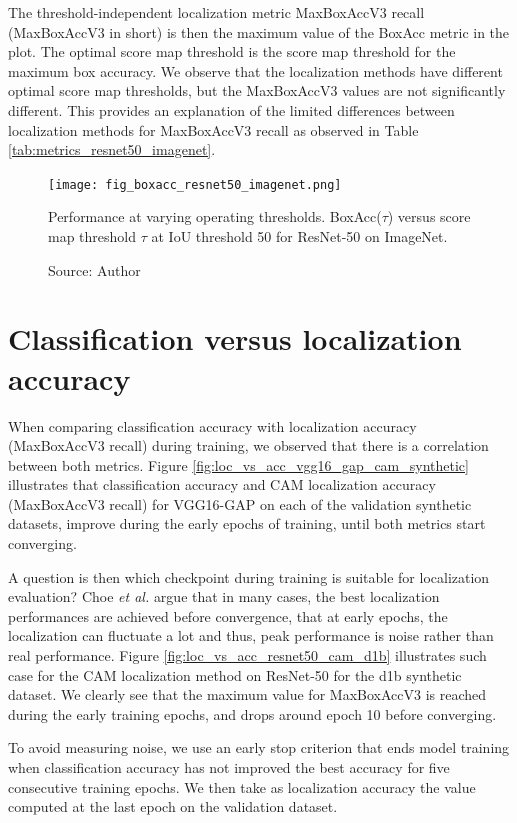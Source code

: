The threshold-independent localization metric MaxBoxAccV3 recall (MaxBoxAccV3 in short) is then the maximum value of the BoxAcc metric in the plot. The optimal score map threshold is the score map threshold for the maximum box accuracy. We observe that the localization methods have different optimal score map thresholds, but the MaxBoxAccV3 values are not significantly different. This provides an explanation of the limited differences between localization methods for MaxBoxAccV3 recall as observed in Table \ref{tab:metrics_resnet50_imagenet}.

\begin{figure}[ht]
    \begin{center}       
    \texttt{[image: fig\_boxacc\_resnet50\_imagenet.png]}
    \caption[BoxAcc (IoU 50)for ResNet-50 on ImageNet]{Performance at varying operating thresholds. BoxAcc($\tau$) versus score map threshold $\tau$ at IoU threshold 50 for ResNet-50 on ImageNet.}
    \caption*{Source: Author}
    \label{fig:boxacc_resnet50_imagenet}
    \end{center}
\end{figure}

\section{Classification versus localization accuracy}
When comparing classification accuracy with localization accuracy (MaxBoxAccV3 recall) during training, we observed that there is a correlation between both metrics. Figure \ref{fig:loc_vs_acc_vgg16_gap_cam_synthetic} illustrates that classification accuracy and CAM localization accuracy (MaxBoxAccV3 recall) for VGG16-GAP on each of the validation synthetic datasets, improve during the early epochs of training, until both metrics start converging.

A question is then which checkpoint during training is suitable for localization evaluation? Choe \textit{et al.} \cite{choe2020evaluating} argue that in many cases, the best localization performances are achieved before convergence, that at early epochs, the localization can fluctuate a lot and thus, peak performance is noise rather than real performance. Figure \ref{fig:loc_vs_acc_resnet50_cam_d1b} illustrates such case for the CAM localization method on ResNet-50 for the d1b synthetic dataset. We clearly see that the maximum value for MaxBoxAccV3 is reached during the early training epochs, and drops around epoch 10 before converging.

To avoid measuring noise, we use an early stop criterion that ends model training when classification accuracy has not improved the best accuracy for five consecutive training epochs. We then take as localization accuracy the value computed at the last epoch on the validation dataset.

